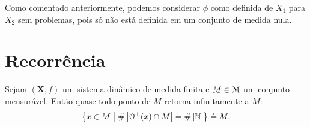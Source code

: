 
Como comentado anteriormente, podemos considerar $\phi$ como definida de $X_1$ para $X_2$ sem problemas, pois só não está definida em um conjunto de medida nula.

\section{Recorrência}

\begin{theorem}[Recorrência]
\label{teo:sd.poincare}
Sejam $(\bm X,f)$ um sistema dinâmico de medida finita e $M \in \mathcal{M}$ um conjunto mensurável. Então quase todo ponto de $M$ retorna infinitamente a $M$:
	\begin{equation*}
	\left\{{x \in M}\;\middle\vert\;{\#\left\lvert{\mathcal{O}^+(x) \cap M}\right\rvert = \#\left\lvert{\mathbb{N}}\right\rvert}\right\} \circeq M.
	\end{equation*}
\end{theorem}
